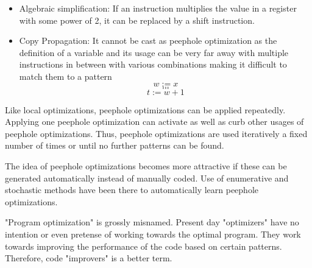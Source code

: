 \begin{itemize}
    \item Algebraic simplification: If an instruction multiplies the value in a register with some power of 2, it can be replaced by a shift instruction.
    \item Copy Propagation: It cannot be cast as peephole optimization as the definition of a variable and its usage can be very far away with multiple instructions in between with various combinations making it difficult to match them to a pattern
    \[w := x\]
    \[...\]
    \[...\]
    \[t := w + 1\]
\end{itemize}

Like local optimizations, peephole optimizations can be applied repeatedly. Applying one peephole optimization can activate as well as curb other usages of peephole optimizations. Thus, peephole optimizations are used iteratively a fixed number of times or until no further patterns can be found.

The idea of peephole optimizations becomes more attractive if these can be generated automatically instead of manually coded. Use of enumerative and stochastic methods have been there to automatically learn peephole optimizations.

"Program optimization" is grossly misnamed. Present day "optimizers" have no intention or even pretense of working towards the optimal program. They work towards improving the performance of the code based on certain patterns. Therefore, code "improvers" is a better term.
